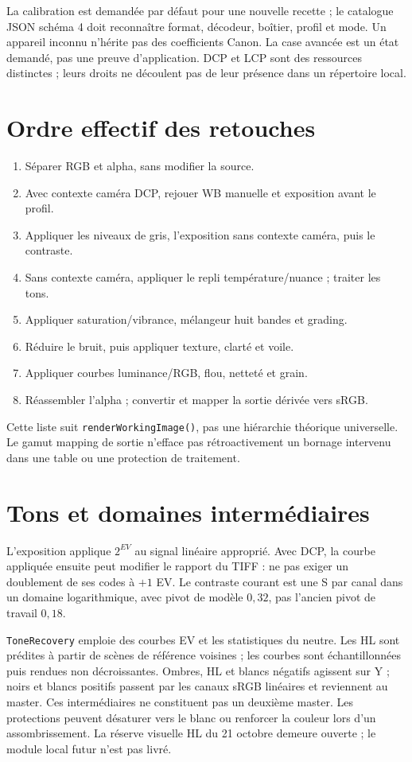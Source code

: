 La calibration est demandée par défaut pour une nouvelle recette ; le
catalogue JSON schéma 4 doit reconnaître format, décodeur, boîtier, profil
et mode. Un appareil inconnu n'hérite pas des coefficients Canon. La case
avancée est un état demandé, pas une preuve d'application. DCP et LCP sont
des ressources distinctes ; leurs droits ne découlent pas de leur présence
dans un répertoire local.

\section{Ordre effectif des retouches}
\begin{enumerate}
\item Séparer RGB et alpha, sans modifier la source.
\item Avec contexte caméra DCP, rejouer WB manuelle et exposition avant le profil.
\item Appliquer les niveaux de gris, l'exposition sans contexte caméra, puis le contraste.
\item Sans contexte caméra, appliquer le repli température/nuance ; traiter les tons.
\item Appliquer saturation/vibrance, mélangeur huit bandes et grading.
\item Réduire le bruit, puis appliquer texture, clarté et voile.
\item Appliquer courbes luminance/RGB, flou, netteté et grain.
\item Réassembler l'alpha ; convertir et mapper la sortie dérivée vers sRGB.
\end{enumerate}
Cette liste suit \texttt{renderWorkingImage()}, pas une hiérarchie théorique
universelle. Le gamut mapping de sortie n'efface pas rétroactivement un
bornage intervenu dans une table ou une protection de traitement.

\section{Tons et domaines intermédiaires}
L'exposition applique $2^{EV}$ au signal linéaire approprié. Avec DCP, la
courbe appliquée ensuite peut modifier le rapport du TIFF : ne pas exiger
un doublement de ses codes à $+1$ EV. Le contraste courant est une S par
canal dans un domaine logarithmique, avec pivot de modèle $0{,}32$,
pas l'ancien pivot de travail $0{,}18$.

\texttt{ToneRecovery} emploie des courbes EV et les statistiques du neutre.
Les HL sont prédites à partir de scènes de référence voisines ; les courbes
sont échantillonnées puis rendues non décroissantes. Ombres, HL et blancs
négatifs agissent sur Y ; noirs et blancs positifs passent par les canaux
sRGB linéaires et reviennent au master. Ces intermédiaires ne constituent
pas un deuxième master. Les protections peuvent désaturer vers le blanc
ou renforcer la couleur lors d'un assombrissement. La réserve visuelle HL
du 21 octobre demeure ouverte ; le module local futur n'est pas livré.

